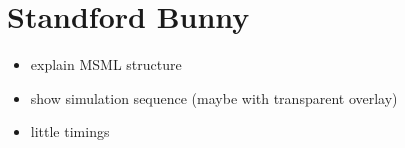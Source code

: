 \section{Standford Bunny}
\label{sec:bunny}

\begin{itemize}
\item explain MSML structure
\item show simulation sequence (maybe with transparent overlay)
\item little timings
\end{itemize}

\kant[10]


\kant[10]


\kant[10]


\kant[10]


\kant[10]


\kant[10]


\kant[10]


\kant[10]


\kant[10]


\kant[10]


\kant[10]


\kant[10]
